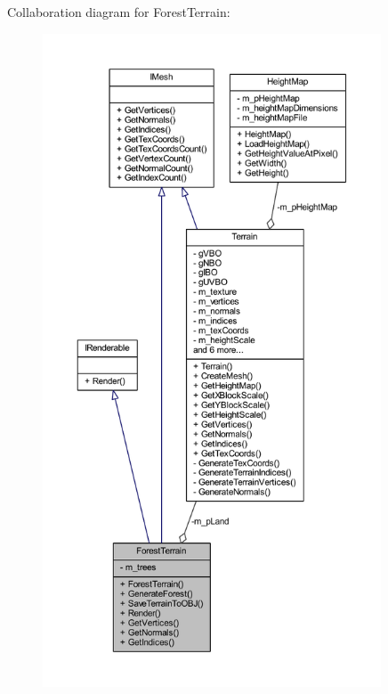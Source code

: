 Collaboration diagram for Forest\+Terrain\+:\nopagebreak
\begin{figure}[H]
\begin{center}
\leavevmode
\includegraphics[height=550pt]{class_forest_terrain__coll__graph}
\end{center}
\end{figure}
